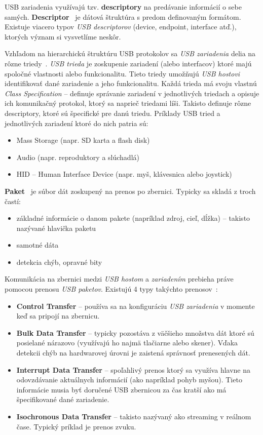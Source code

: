 USB zariadenia využívajú tzv. \textbf{descriptory} na predávanie informácií o sebe samých. \textbf{Descriptor}~\cite{usb_descriptor} je dátová štruktúra s predom definovaným formátom. Existuje viacero typov \textit{USB descriptorov} (device, endpoint, interface atď.), ktorých význam si vysvetlíme neskôr.

Vzhľadom na hierarchickú štruktúru USB protokolov sa \textit{USB zariadenia} delia na rôzne triedy~\cite{usb_classes}. \textit{USB trieda} je zoskupenie zariadení (alebo interfacov) ktoré majú spoločné vlastnosti alebo funkcionalitu. Tieto triedy umožňujú \textit{USB hostovi} identifikovať dané zariadenie a jeho funkcionalitu. Každá trieda má svoju vlastnú \textit{Class Specification} -- definuje správanie zariadení v jednotlivých triedach a opisuje ich komunikačný protokol, ktorý sa naprieč triedami líši. Takisto definuje rôzne descriptory, ktoré sú špecifické pre danú triedu. Príklady USB tried a jednotlivých zariadení ktoré do nich patria sú:
\begin{itemize}
\item Mass Storage (napr. SD karta a flash disk)
\item Audio (napr. reproduktory a slúchadlá)
\item HID -- Human Interface Device (napr. myš, klávesnica alebo joystick)
\end{itemize}

\textbf{Paket}~\cite{usb_packet} je súbor dát zoskupený na prenos po zbernici. Typicky sa skladá z troch častí:
\begin{itemize}
\item základné informácie o danom pakete (napríklad zdroj, cieľ, dĺžka) -- takisto nazývané hlavička paketu
\item samotné dáta
\item detekcia chýb, opravné bity
\end{itemize}

Komunikácia na zbernici medzi \textit{USB hostom} a \textit{zariadením} prebieha práve pomocou prenosu \textit{USB paketov}.   Existujú 4 typy takýchto prenosov~\cite{usb_type_transfers}:
\begin{itemize}
\item \textbf{Control Transfer} -- používa sa na konfiguráciu \textit{USB zariadenia} v momente keď sa pripojí na zbernicu.
\item \textbf{Bulk Data Transfer} -- typicky pozostáva z väčšieho množstva dát ktoré sú posielané nárazovo (využívajú ho najmä tlačiarne alebo skener). Vďaka detekcii chýb na hardwarovej úrovni je zaistená správnosť prenesených dát.
\item \textbf{Interrupt Data Transfer} -- spoľahlivý prenos ktorý sa využíva hlavne na odovzdávanie aktuálnych informácií (ako napríklad pohyb myšou). Tieto informácie musia byť doručené USB zbernicou za čas kratší ako má špecifikované dané zariadenie.
\item \textbf{Isochronous Data Transfer} -- takisto nazývaný ako streaming v reálnom čase. Typický príklad je prenos zvuku.
\end{itemize}

